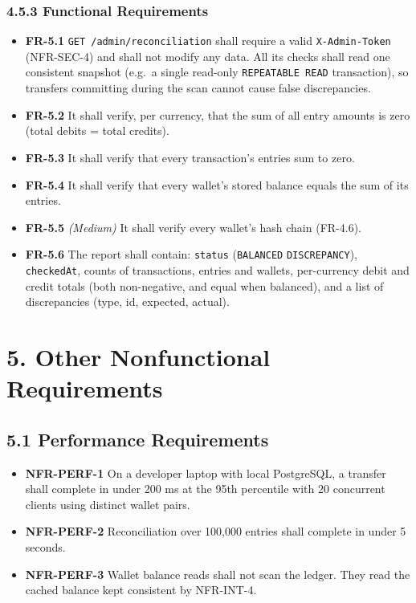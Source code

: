 \documentclass[11pt,a4paper]{article}
\providecommand{\tightlist}{\setlength{\itemsep}{2pt}\setlength{\parskip}{0pt}}
\begin{document}
\subsubsection{4.5.3 Functional Requirements}\label{functional-requirements-4}

\begin{itemize}
\tightlist
\item
  \textbf{FR-5.1} \texttt{GET\ /\allowbreak{}admin/\allowbreak{}reconciliation} shall require a valid \texttt{X-Admin-Token} (NFR-SEC-4) and
  shall not modify any data. All its checks shall read one consistent snapshot (e.g.~a single
  read-only \texttt{REPEATABLE\ READ} transaction), so transfers committing during the scan cannot cause
  false discrepancies.
\item
  \textbf{FR-5.2} It shall verify, per currency, that the sum of all entry amounts is zero (total
  debits = total credits).
\item
  \textbf{FR-5.3} It shall verify that every transaction's entries sum to zero.
\item
  \textbf{FR-5.4} It shall verify that every wallet's stored balance equals the sum of its entries.
\item
  \textbf{FR-5.5} \emph{(Medium)} It shall verify every wallet's hash chain (FR-4.6).
\item
  \textbf{FR-5.6} The report shall contain: \texttt{status} (\texttt{BALANCED} \textbar{} \texttt{DISCREPANCY}), \texttt{checkedAt}, counts of
  transactions, entries and wallets, per-currency debit and credit totals (both non-negative, and
  equal when balanced), and a list of discrepancies (type, id, expected, actual).
\end{itemize}

\section{5. Other Nonfunctional Requirements}\label{other-nonfunctional-requirements}

\subsection{5.1 Performance Requirements}\label{performance-requirements}

\begin{itemize}
\tightlist
\item
  \textbf{NFR-PERF-1} On a developer laptop with local PostgreSQL, a transfer shall complete in under
  200 ms at the 95th percentile with 20 concurrent clients using distinct wallet pairs.
\item
  \textbf{NFR-PERF-2} Reconciliation over 100,000 entries shall complete in under 5 seconds.
\item
  \textbf{NFR-PERF-3} Wallet balance reads shall not scan the ledger. They read the cached balance kept
  consistent by NFR-INT-4.
\end{itemize}
\end{document}
